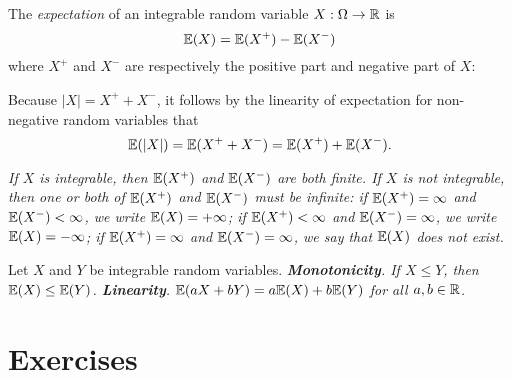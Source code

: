 \begin{definition}
The \emph{expectation} of an integrable random variable $X:\Omega\to\mathbb{R}$ is
\[
\mathbb{E}(X) = \mathbb{E}(X^{+}) - \mathbb{E}(X^{-})
\]
where $X^{+}$ and $X^{-}$ are respectively the positive part and negative part of $X$:
\end{definition}

\begin{remark}
Because $|X| = X^{+} + X^{-}$, it follows by the linearity of expectation for non-negative random variables that
\[
\mathbb{E}(|X|) = \mathbb{E}(X^{+} + X^{-}) = \mathbb{E}(X^{+}) + \mathbb{E}(X^{-}).
\]

\ben
\it If $X$ is integrable, then $\mathbb{E}(X^{+})$ and $\mathbb{E}(X^{-})$ are both finite.
\it If $X$ is not integrable, then one or both of $\mathbb{E}(X^{+})$ and $\mathbb{E}(X^{-})$ must be infinite:
	\bit
	\it if $\mathbb{E}(X^{+})=\infty$ and $\mathbb{E}(X^{-})<\infty$, we write $\mathbb{E}(X) = +\infty$;
	\it if $\mathbb{E}(X^{+})<\infty$ and $\mathbb{E}(X^{-})=\infty$, we write $\mathbb{E}(X)= -\infty$;
	\it if $\mathbb{E}(X^{+})=\infty$ and $\mathbb{E}(X^{-})=\infty$, we say that $\mathbb{E}(X)$ \emph{does not exist}.
	\eit
\een
\end{remark}

\begin{theorem}
Let $X$ and $Y$ be integrable random variables.
\ben
\it \textbf{Monotonicity}. If $X\leq Y$, then $\mathbb{E}(X)\leq\mathbb{E}(Y)$.
\it \textbf{Linearity}. $\mathbb{E}(aX+bY) = a\mathbb{E}(X) + b\mathbb{E}(Y)$ for all $a,b\in\mathbb{R}$.
\een
\end{theorem}

\proofomitted

\section{Exercises}


\endinput
